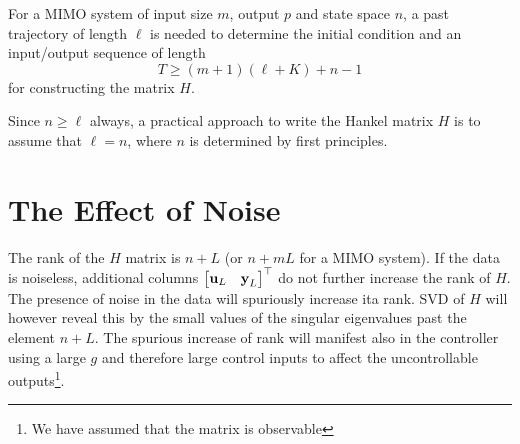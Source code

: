 For a MIMO system of input size $m$, output $p$ and state space $n$, a past trajectory of length $\ell$ is needed to determine the initial condition and an input/output sequence of length
\begin{equation*}
  T \ge (m+1)(\ell + K) + n -1
\end{equation*}
for constructing the matrix $H$.

Since $n\ge \ell$ always, a practical approach to write the Hankel matrix $H$ is to assume that $\ell = n$, where $n$ is determined by first principles.

\section{The Effect of Noise}
\label{sec:deepc-presence-of-noise}

The rank of the $H$ matrix is $n+L$ (or $n+mL$ for a MIMO system). If the data is noiseless, additional columns $
\begin{bmatrix}
  \boldsymbol{\mathrm{u}}_L & \boldsymbol{\mathrm{y}}_L
\end{bmatrix}^\top
$ do not further increase the rank of $H$. The presence of noise in the data will spuriously increase ita rank. SVD of $H$ will however reveal this by the small values of the singular eigenvalues past the element $n+L$. The spurious increase of rank will manifest also in the controller using a large $g$ and therefore large control inputs to affect the uncontrollable outputs\footnote{We have assumed that the matrix is observable}.

